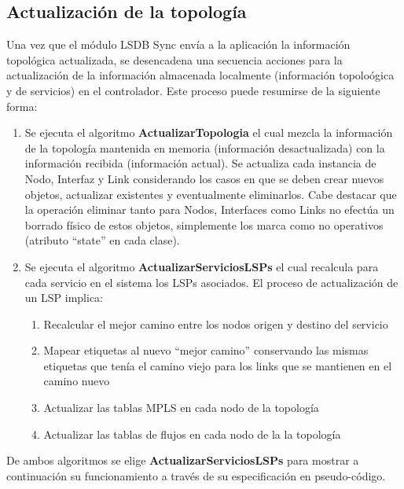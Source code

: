 \subsection{Actualizaci\'on de la topolog\'ia}
Una vez que el m\'odulo LSDB Sync envía a la aplicaci\'on la informaci\'on topol\'ogica actualizada, se desencadena una secuencia acciones para la actualizaci\'on de la informaci\'on almacenada localmente 
 (informaci\'on topolo\'ogica y de servicios) en el controlador. Este proceso puede resumirse de la siguiente forma:

\begin{enumerate}
\item Se ejecuta el algoritmo \textbf{ActualizarTopologia} el cual mezcla la informaci\'on de la topolog\'ia mantenida en memoria (informaci\'on desactualizada) con la informaci\'on recibida  
 (informaci\'on actual). Se actualiza cada instancia de Nodo, Interfaz y Link considerando los casos en que se deben crear nuevos objetos, actualizar existentes y eventualmente eliminarlos. Cabe destacar que la operaci\'on eliminar tanto para Nodos, Interfaces como Links no efectúa un borrado f\'isico de estos objetos, simplemente los marca como no operativos (atributo “state” en cada clase).  

\item Se ejecuta el algoritmo \textbf{ActualizarServiciosLSPs} el cual recalcula para cada servicio en el sistema los LSPs asociados. El proceso de actualización de un LSP implica:

\begin{enumerate}
\item Recalcular el mejor camino entre los nodos origen y destino del servicio
\item Mapear etiquetas al nuevo “mejor camino” conservando las mismas etiquetas que ten\'ia el camino viejo para los links que se mantienen en el camino nuevo
\item Actualizar las tablas MPLS en cada nodo de la topolog\'ia
\item Actualizar las tablas de flujos en cada nodo de la la topolog\'ia  
\end{enumerate}

\end{enumerate}    

De ambos algoritmos se elige \textbf{ActualizarServiciosLSPs} para mostrar a continuaci\'on su funcionamiento a trav\'es de su especificaci\'on en pseudo-c\'odigo.
 

